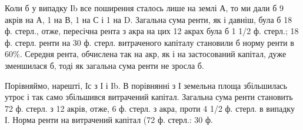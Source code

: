 Коли б у випадку Іb все поширення сталось лише на землі А, то ми
дали б 9 акрів на А, 1 на В, 1 на С і 1 на D. Загальна сума ренти, як і давніш,
була б 18 ф. стерл., отже, пересічна рента з акра на цих 12 акрах
була б 1 1/2 ф. стерл.; 18 ф. стерл. ренти на 30 ф. стерл. витраченого капіталу
становили б норму ренти в 60\%. Середня рента, обчислена так на акр,
як і на застосований капітал, дуже зменшилася б, тоді як загальна сума ренти
не зросла б.

Порівняймо, нарешті, Іс з І і Іb. В порівнянні з І земельна площа збільшилась
утроє і так само збільшився витрачений капітал. Загальна сума ренти
становить 72 ф. стерл. з 12 акрів, отже, 6 ф. стерл. з акра, проти 4 1/2 ф.
стерл. в випадку І. Норма ренти на витрачений капітал (72 ф. стерл.: 30 ф.
\parbreak{}  %
